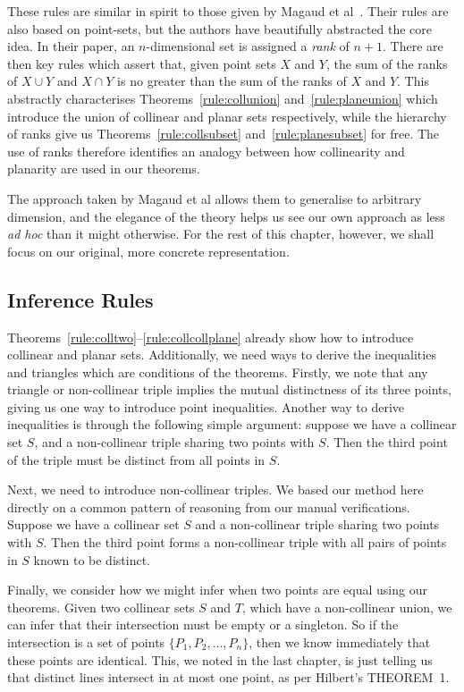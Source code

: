 These rules are similar in spirit to those given by Magaud et al~\cite{RankDesargues}. Their rules are also based on point-sets, but the authors have beautifully abstracted the core idea. In their paper, an $n$-dimensional set is assigned a \emph{rank} of $n+1$. There are then key rules which assert that, given point sets $X$ and $Y$, the sum of the ranks of $X \cup Y$ and $X \cap Y$ is no greater than the sum of the ranks of $X$ and $Y$. This abstractly characterises Theorems~\ref{rule:collunion} and~\ref{rule:planeunion} which introduce the union of collinear and planar sets respectively, while the hierarchy of ranks give us Theorems~\ref{rule:collsubset} and~\ref{rule:planesubset} for free. The use of ranks therefore identifies an analogy between how collinearity and planarity are used in our theorems.

The approach taken by Magaud et al allows them to generalise to arbitrary dimension, and the elegance of the theory helps us see our own approach as less \emph{ad hoc} than it might otherwise. For the rest of this chapter, however, we shall focus on our original, more concrete representation.

\subsection{Inference Rules}\label{list:Procedures}
Theorems~\ref{rule:colltwo}--\ref{rule:collcollplane} already show how to introduce collinear and planar sets. Additionally, we need ways to derive the inequalities and triangles which are conditions of the theorems. Firstly, we note that any triangle or non-collinear triple implies the mutual distinctness of its three points, giving us one way to introduce point inequalities. Another way to derive inequalities is through the following simple argument: suppose we have a collinear set $S$, and a non-collinear triple sharing two points with $S$. Then the third point of the triple must be distinct from all points in $S$. 

Next, we need to introduce non-collinear triples. We based our method here directly on a common pattern of reasoning from our manual verifications. Suppose we have a collinear set $S$ and a non-collinear triple sharing two points with $S$. Then the third point forms a non-collinear triple with all pairs of points in $S$ known to be distinct.

Finally, we consider how we might infer when two points are equal using our theorems. Given two collinear sets $S$ and $T$, which have a non-collinear union, we can infer that their intersection must be empty or a singleton. So if the intersection is a set of points $\{P_1,P_2,\ldots,P_n\}$, then we know immediately that these points are identical. This, we noted in the last chapter, is just telling us that distinct lines intersect in at most one point, as per Hilbert's THEOREM~1.

